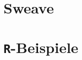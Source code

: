 \documentclass[twoside]{scrartcl}
\providecommand{\R}{\texttt{R}}
\begin{document}


\appendix
\section{Sweave\label{app:sweave}}

\pagebreak
\section{\R{}-Beispiele\label{app:R}}


%
\end{document}
